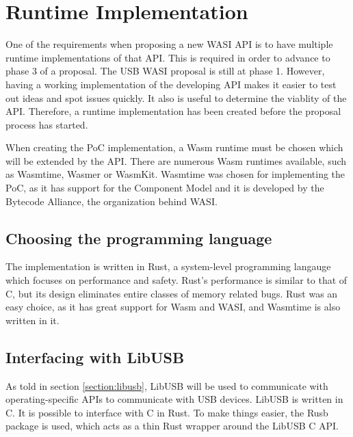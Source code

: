 \section{Runtime Implementation}
One of the requirements when proposing a new \acrshort{WASI} \acrshort{API} is to have multiple runtime implementations of that \acrshort{API}. This is required in order to advance to phase 3 of a proposal. The \acrshort{USB} \acrshort{WASI} proposal is still at phase 1. However, having a working implementation of the developing \acrshort{API} makes it easier to test out ideas and spot issues quickly. It also is useful to determine the viablity of the \acrshort{API}. Therefore, a runtime implementation has been created before the proposal process has started.

When creating the \acrshort{PoC} implementation, a \acrshort{Wasm} runtime must be chosen which will be extended by the \acrshort{API}. There are numerous \acrshort{Wasm} runtimes available, such as Wasmtime, Wasmer or WasmKit. Wasmtime was chosen for implementing the \acrshort{PoC}, as it has support for the Component Model and it is developed by the Bytecode Alliance, the organization behind \acrshort{WASI}.

\subsection{Choosing the programming language}
The implementation is written in Rust, a system-level programming langauge which focuses on performance and safety. Rust's performance is similar to that of C, but its design eliminates entire classes of memory related bugs. Rust was an easy choice, as it has great support for \acrshort{Wasm} and \acrshort{WASI}, and Wasmtime is also written in it.

\subsection{Interfacing with LibUSB}
As told in section \ref{section:libusb}, LibUSB will be used to communicate with operating-specific APIs to communicate with USB devices. LibUSB is written in C. It is possible to interface with C in Rust. To make things easier, the Rusb package is used, which acts as a thin Rust wrapper around the LibUSB C API.

